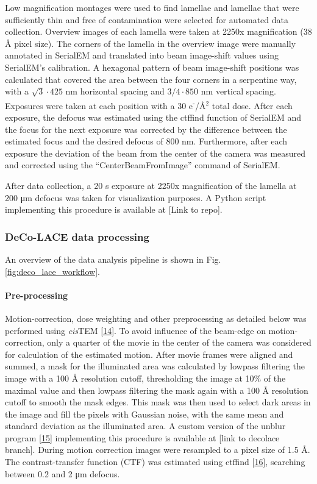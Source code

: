 \documentclass[
]{article}
\begin{document}
Low magnification montages were used to find lamellae and lamellae that were
sufficiently thin and free of contamination were selected for automated data
collection. Overview images of each lamella were taken at 2250x magnification
(38 Å pixel size). The corners of the lamella in the overview image were manually
annotated in SerialEM and translated into beam image-shift values using SerialEM's
calibration. A hexagonal pattern of beam image-shift positions was calculated
that covered the area between the four corners in a serpentine way, with a
\(\sqrt{3}\cdot425\) nm horizontal spacing and \(3/4\cdot 850\) nm vertical spacing. Exposures were
taken at each position with a 30 e\textsuperscript{-}/Å\(^2\) total dose. After each exposure, the
defocus was estimated using the ctffind function of SerialEM and the focus for
the next exposure was corrected by the difference between the estimated focus
and the desired defocus of 800 nm. Furthermore, after each exposure the
deviation of the beam from the center of the camera was measured and corrected
using the ``CenterBeamFromImage'' command of SerialEM.

After data collection, a 20 s exposure at 2250x magnification of the lamella at
200 μm defocus was taken for visualization purposes. A Python script implementing
this procedure is available at {[}Link to repo{]}.

\hypertarget{deco-lace-data-processing}{%
\subsubsection{DeCo-LACE data processing}\label{deco-lace-data-processing}}

An overview of the data analysis pipeline is shown in Fig.
\ref{fig:deco_lace_workflow}.

\hypertarget{pre-processing}{%
\paragraph{Pre-processing}\label{pre-processing}}

Motion-correction, dose weighting and other preprocessing as detailed below was performed using \emph{cis}TEM {[}\protect\hyperlink{ref-MUY42yxp}{14}{]}. To avoid influence of the beam-edge on motion-correction, only a quarter of the
movie in the center of the camera was considered for calculation of the
estimated motion. After movie frames were aligned and summed, a mask for the
illuminated area was calculated by lowpass filtering the image with a 100 Å
resolution cutoff, thresholding the image at 10\% of the maximal value and then lowpass
filtering the mask again with a 100 Å resolution cutoff to smooth the mask edges. This mask was
then used to select dark areas in the image and fill the pixels with
Gaussian noise, with the same mean and standard deviation as the illuminated
area. A custom version of the unblur program {[}\protect\hyperlink{ref-1G4Y94qCy}{15}{]}
implementing this procedure is available at {[}link to decolace branch{]}. During motion correction images were resampled to a pixel size of 1.5 Å. The
contrast-transfer function (CTF) was estimated using ctffind
{[}\protect\hyperlink{ref-n43f3Sqs}{16}{]}, searching between 0.2 and 2 μm defocus.
\end{document}

